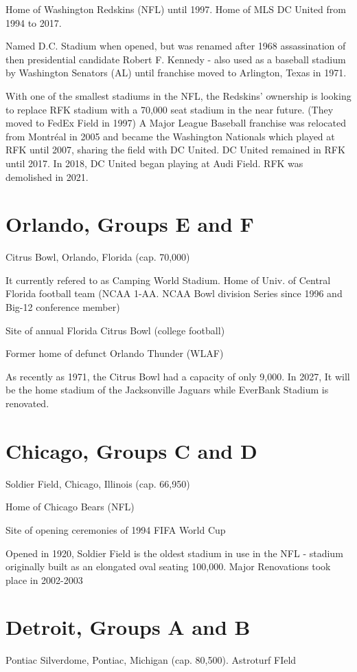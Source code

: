 Home of Washington Redskins (NFL) until 1997.  Home of MLS DC United from 1994 to 2017.

Named D.C. Stadium when opened, but was renamed after 1968 assassination of 
then presidential candidate Robert F. Kennedy - also used as a baseball stadium
by Washington Senators (AL) until franchise moved to Arlington, Texas in 1971.

With one of the smallest stadiums in the NFL, the Redskins' ownership is 
looking to replace RFK stadium with a 70,000 seat stadium in the near future.  (They moved
to FedEx Field in 1997)  A Major League Baseball franchise was relocated from
Montr{\'e}al in 2005 and became the Washington Nationals which played at RFK until 2007,
sharing the field with DC United.  DC United remained in RFK until 2017.  In 2018, DC United
began playing at Audi Field.  RFK was demolished in 2021.
\section{Orlando, Groups E and F}
Citrus Bowl, Orlando, Florida (cap. 70,000)

It currently refered to as Camping World Stadium.  Home of Univ. of Central Florida football team (NCAA 1-AA.  NCAA Bowl division Series since 1996 and
Big-12 conference member)

Site of annual Florida Citrus Bowl (college football)

Former home of defunct Orlando Thunder (WLAF)

As recently as 1971, the Citrus Bowl had a capacity of only 9,000.  In 2027, It will be the home stadium of the Jacksonville Jaguars while
EverBank Stadium is renovated.
\section{Chicago, Groups C and D}
Soldier Field, Chicago, Illinois (cap. 66,950)

Home of Chicago Bears (NFL)

Site of opening ceremonies of 1994 FIFA World Cup

Opened in 1920, Soldier Field is the oldest stadium in use in the NFL - stadium
originally built as an elongated oval seating 100,000.  Major Renovations took place 
in 2002-2003
\section{Detroit, Groups A and B}
Pontiac Silverdome, Pontiac, Michigan (cap. 80,500).  Astroturf FIeld

